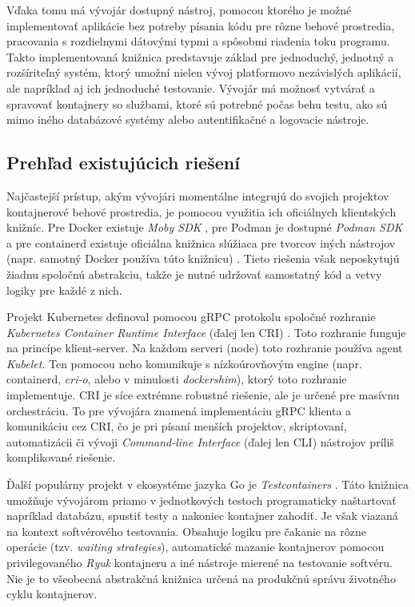 \documentclass[
 program=infpvs,
  language=slovak,
  figures=false,
  tables=false,
  sourcecodes,
  glossaries,
  index
]{kidiplom}
\begin{document}
Vďaka tomu má vývojár dostupný nástroj, pomocou ktorého je možné implementovať aplikácie bez potreby písania kódu pre rôzne behové prostredia, pracovania s rozdielnymi dátovými typmi a spôsobmi riadenia toku programu. Takto implementovaná knižnica predstavuje základ pre jednoduchý, jednotný a rozšíriteľný systém, ktorý umožní nielen vývoj platformovo nezávislých aplikácií, ale napríklad aj ich jednoduché testovanie. Vývojár má možnosť vytvárať a spravovať kontajnery so službami, ktoré sú potrebné počas behu testu, ako sú mimo iného databázové systémy alebo autentifikačné a logovacie nástroje.

\subsection{Prehľad existujúcich riešení}  \label{sec:prehlad-rieseni}
Najčastejší prístup, akým vývojári momentálne integrujú do svojich projektov kontajnerové behové prostredia, je pomocou využitia ich oficiálnych klientských knižníc. Pre Docker existuje  \textit{Moby SDK} \cite{moby}, pre Podman je dostupné  \textit{Podman SDK} \cite{podman-go} a pre containerd existuje oficiálna knižnica slúžiaca pre tvorcov iných nástrojov (napr. samotný Docker používa túto knižnicu) \cite{containerd-lib}. Tieto riešenia však neposkytujú žiadnu spoločnú abstrakciu, takže je nutné udržovať samostatný kód a vetvy logiky pre každé z nich.

Projekt Kubernetes definoval pomocou gRPC protokolu spoločné rozhranie \textit{Kubernetes Container Runtime Interface} (ďalej len CRI) \cite{kube-cri}. Toto rozhranie funguje na princípe klient-server. Na každom serveri (node) toto rozhranie používa agent  \textit{Kubelet}. Ten pomocou neho komunikuje s nízkoúrovňovým engine (napr.  containerd,  \textit{cri-o}, alebo v minulosti  \textit{dockershim}), ktorý toto rozhranie implementuje. CRI je síce extrémne robustné riešenie, ale je určené pre masívnu orchestráciu. To pre vývojára znamená implementáciu gRPC klienta a komunikáciu cez CRI, čo je pri písaní menších projektov, skriptovaní, automatizácii či vývoji \textit{Command-line Interface} (ďalej len CLI) nástrojov príliš komplikované riešenie.

Ďalší populárny projekt v ekosystéme jazyka Go je  \textit{Testcontainers} \cite{testcontainers}. Táto knižnica umožňuje vývojárom priamo v jednotkových testoch programaticky naštartovať napríklad databázu, spustiť testy a nakoniec kontajner zahodiť. Je však viazaná na kontext softvérového testovania. Obsahuje logiku pre čakanie na rôzne operácie (tzv.  \textit{waiting strategies}), automatické mazanie kontajnerov pomocou privilegovaného \textit{Ryuk} kontajneru a iné nástroje mierené na testovanie softvéru. Nie je to všeobecná abstrakčná knižnica určená na produkčnú správu životného cyklu kontajnerov.
\end{document}
